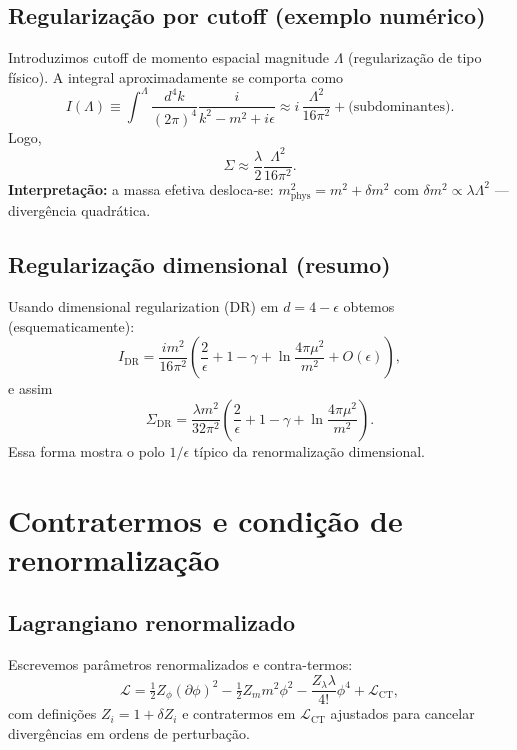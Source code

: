 \documentclass[12pt,a4paper]{article}
\begin{document}
\subsection{Regularização por cutoff (exemplo numérico)}
Introduzimos cutoff de momento espacial magnitude \(\Lambda\) (regularização de tipo físico). A integral aproximadamente se comporta como
\begin{equation}
I(\Lambda) \equiv \int^{\Lambda} \frac{d^4k}{(2\pi)^4} \frac{i}{k^2 - m^2 + i\epsilon} \approx i\,\frac{\Lambda^2}{16\pi^2} + \text{(subdominantes)}.
\end{equation}
Logo,
\begin{equation}
\Sigma \approx \frac{\lambda}{2} \frac{\Lambda^2}{16\pi^2}.
\end{equation}
\textbf{Interpretação:} a massa efetiva desloca-se: \(m^2_{\text{phys}} = m^2 + \delta m^2\) com \(\delta m^2 \propto \lambda \Lambda^2\) — divergência quadrática.

\subsection{Regularização dimensional (resumo)}
Usando dimensional regularization (DR) em \(d=4-\epsilon\) obtemos (esquematicamente):
\begin{equation}
I_{\text{DR}} = \frac{i m^2}{16\pi^2} \left(\frac{2}{\epsilon} + 1 - \gamma + \ln\frac{4\pi\mu^2}{m^2} + O(\epsilon)\right),
\end{equation}
e assim
\begin{equation}
\Sigma_{\text{DR}} = \frac{\lambda m^2}{32\pi^2} \left(\frac{2}{\epsilon} + 1 - \gamma + \ln\frac{4\pi\mu^2}{m^2}\right).
\end{equation}
Essa forma mostra o polo \(1/\epsilon\) típico da renormalização dimensional.  %

\section{Contratermos e condição de renormalização}
\subsection{Lagrangiano renormalizado}
Escrevemos parâmetros renormalizados e contra-termos:
\begin{equation}
\mathcal{L} = \tfrac12 Z_\phi (\partial\phi)^2 - \tfrac12 Z_m m^2 \phi^2 - \frac{Z_\lambda \lambda}{4!} \phi^4 + \mathcal{L}_{\text{CT}},
\end{equation}
com definições \(Z_i = 1 + \delta Z_i\) e contratermos em \(\mathcal{L}_{\text{CT}}\) ajustados para cancelar divergências em ordens de perturbação.
\end{document}
